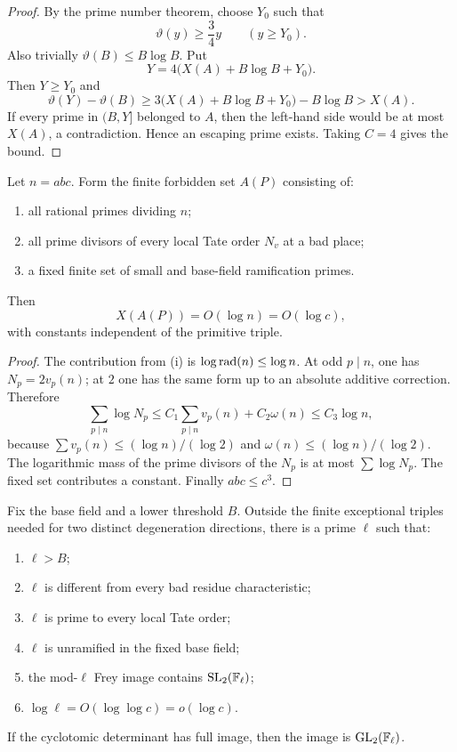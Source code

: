 \begin{proof}
By the prime number theorem, choose $Y_0$ such that
\[
 \vartheta(y)\ge\frac34y\qquad(y\ge Y_0).
\]
Also trivially $\vartheta(B)\le B\log B$.  Put
\[
 Y=4\bigl(X(A)+B\log B+Y_0\bigr).
\]
Then $Y\ge Y_0$ and
\[
 \vartheta(Y)-\vartheta(B)
 \ge3\bigl(X(A)+B\log B+Y_0\bigr)-B\log B
 >X(A).
\]
If every prime in $(B,Y]$ belonged to $A$, then the left-hand side would be at most $X(A)$, a contradiction.  Hence an escaping prime exists.  Taking $C=4$ gives the bound.
\end{proof}

\begin{proposition}\label{prop:frey-mass}
Let $n=abc$.  Form the finite forbidden set $A(P)$ consisting of:
\begin{enumerate}[label=(\roman*)]
\item all rational primes dividing $n$;
\item all prime divisors of every local Tate order $N_v$ at a bad place;
\item a fixed finite set of small and base-field ramification primes.
\end{enumerate}
Then
\[
 X(A(P))=O(\log n)=O(\log c),
\]
with constants independent of the primitive triple.
\end{proposition}

\begin{proof}
The contribution from (i) is $\log\operatorname{rad}(n)\le\log n$.  At odd $p\mid n$, one has $N_p=2v_p(n)$; at $2$ one has the same form up to an absolute additive correction.  Therefore
\[
 \sum_{p\mid n}\log N_p
 \le C_1\sum_{p\mid n}v_p(n)+C_2\omega(n)
 \le C_3\log n,
\]
because $\sum v_p(n)\le(\log n)/(\log2)$ and $\omega(n)\le(\log n)/(\log2)$.  The logarithmic mass of the prime divisors of the $N_p$ is at most $\sum\log N_p$.  The fixed set contributes a constant.  Finally $abc\le c^3$.
\end{proof}

\begin{corollary}\label{cor:full-prime}
Fix the base field and a lower threshold $B$.  Outside the finite exceptional triples needed for two distinct degeneration directions, there is a prime $\ell$ such that:
\begin{enumerate}[label=(\alph*)]
\item $\ell>B$;
\item $\ell$ is different from every bad residue characteristic;
\item $\ell$ is prime to every local Tate order;
\item $\ell$ is unramified in the fixed base field;
\item the mod-$\ell$ Frey image contains $\operatorname{SL}_2(\mathbb F_\ell)$;
\item $\log\ell=O(\log\log c)=o(\log c)$.
\end{enumerate}
If the cyclotomic determinant has full image, then the image is $\operatorname{GL}_2(\mathbb F_\ell)$.
\end{corollary}

